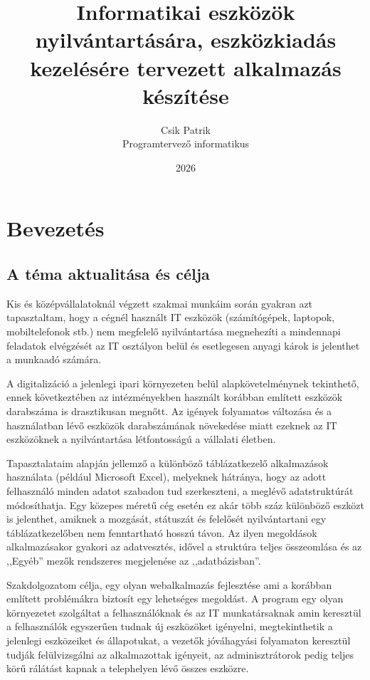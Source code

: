 \documentclass[
]{thesis-ekf}
\theoremstyle{definition}
\theoremstyle{remark}
\begin{document}
\title{Informatikai eszközök nyilvántartására, eszközkiadás kezelésére tervezett alkalmazás készítése}
\author{Csik Patrik\\Programtervező informatikus}
\date{2026}
\maketitle

\tableofcontents

\chapter{Bevezetés}

\section{A téma aktualitása és célja}

Kis és középvállalatoknál végzett szakmai munkáim során gyakran azt tapasztaltam, hogy a cégnél használt IT eszközök (számítógépek, laptopok, mobiltelefonok stb.) nem megfelelő nyilvántartása megnehezíti a mindennapi feladatok elvégzését az IT osztályon belül és esetlegesen anyagi károk is jelenthet a munkaadó számára.

A digitalizáció a jelenlegi ipari környezeten belül alapkövetelménynek tekinthető, ennek következtében az intézményekben használt korábban említett eszközök darabszáma is drasztikusan megnőtt. Az igények folyamatos változása és a használatban lévő eszközök darabszámának növekedése miatt ezeknek az IT eszközöknek a nyilvántartása létfontosságú a vállalati életben.

Tapasztalataim alapján jellemző a különböző táblázatkezelő alkalmazások használata (például Microsoft Excel), melyeknek hátránya, hogy az adott felhasználó minden adatot szabadon tud szerkeszteni, a meglévő adatstruktúrát módosíthatja. Egy közepes méretű cég esetén ez akár több száz különböző eszközt is jelenthet, amiknek a mozgását, státuszát és felelősét nyilvántartani egy táblázatkezelőben nem fenntartható hosszú távon. Az ilyen megoldások alkalmazásakor gyakori az adatvesztés, idővel a struktúra teljes összeomlása és az ,,Egyéb'' mezők rendszeres megjelenése az ,,adatbázisban''.

Szakdolgozatom célja, egy olyan webalkalmazás fejlesztése ami a korábban említett problémákra biztosít egy lehetséges megoldást.
A program egy olyan környezetet szolgáltat a felhasználóknak és az IT munkatársaknak amin keresztül a felhasználók egyszerűen tudnak új eszközöket igényelni, megtekinthetik a jelenlegi eszközeiket és állapotukat, a vezetők jóváhagyási folyamaton keresztül tudják felülvizsgálni az alkalmazottak igényeit, az adminisztrátorok pedig teljes körű rálátást kapnak a telephelyen lévő összes eszközre.
\end{document}

